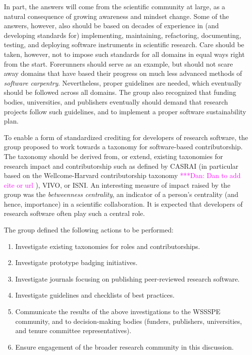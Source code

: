 \documentclass[11pt, oneside]{amsart}
\newcommand{\katznote}[1]{ {\textcolor{magenta}    { ***Dan:      #1 }}}
\begin{document}
In part, the answers will come from the scientific community at large, as a
natural consequence of growing awareness and mindset change.
Some of the answers, however, also should be based on decades of experience
in (and developing standards for) implementing, maintaining, refactoring,
documenting, testing, and deploying software instruments in scientific
research.
Care should be taken, however, not to impose such standards for all domains
in equal ways right from the start.
Forerunners should serve as an example, but should not scare away domains that
have based their progress on much less advanced methods of {\em software
carpentry}.
Nevertheless, proper guidelines are needed, which eventually should be followed
across all domains.
The group also recognized that funding bodies, universities, and publishers
eventually should demand that research projects follow such guidelines, and to
implement a proper software sustainability plan.

To enable a form of standardized crediting for developers of research
software, the group proposed to work towards a taxonomy for software-based
contributorship.
The taxonomy should be derived from, or extend, existing taxonomies for
research impact and contributorship such as defined by CASRAI (in particular
based on the Wellcome-Harvard contributorship taxonomy\katznote{Dan to add cite or url}), VIVO, or ISNI.
An interesting measure of impact raised by the group was the {\em betweenness
centrality}, an indicator of a person's centrality (and hence, importance)
in a scientific collaboration.
It is expected that developers of research software often play such a central
role.

The group defined the following actions to be performed:
\begin{enumerate}
\item Investigate existing taxonomies for roles and contributorships.
\item Investigate prototype badging initiatives.
\item Investigate journals focusing on publishing peer-reviewed research
software.
\item Investigate guidelines and checklists of best practices.
\item Communicate the results of the above investigations to the WSSSPE
community, and to decision-making bodies (funders, publishers, universities,
and tenure committee representatives).
\item Ensure engagement of the broader research community in this discussion.
\end{enumerate}
\end{document}
